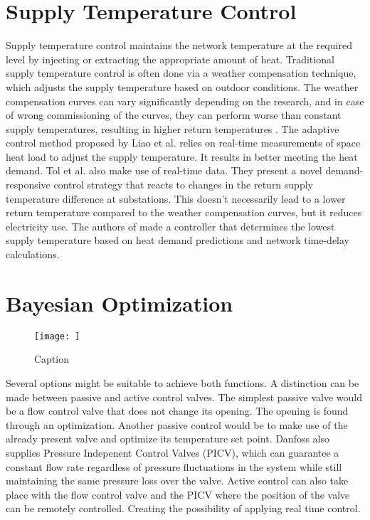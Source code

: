 \section{Supply Temperature Control}
Supply temperature control maintains the network temperature at the required level by injecting or extracting the appropriate amount of heat. Traditional supply temperature control is often done via a weather compensation technique, which adjusts the supply temperature based on outdoor conditions. The weather compensation curves can vary significantly depending on the research, and in case of wrong commissioning of the curves, they can perform worse than constant supply temperatures, resulting in higher return temperatures \cite{app15062982, LIAO200555}. The adaptive control method proposed by Liao et al. \cite{LIAO200555} relies on real-time measurements of space heat load to adjust the supply temperature. It results in better meeting the heat demand. Tol et al. \cite{TOL2021105} also make use of real-time data. They present a novel demand-responsive control strategy that reacts to changes in the return supply temperature difference at substations. This doesn't necessarily lead to a lower return temperature compared to the weather compensation curves, but it reduces electricity use. The authors of \cite{papaKonstantikou} made a controller that determines the lowest supply temperature based on heat demand predictions and network time-delay calculations. 


\section{Bayesian Optimization}

\begin{figure}
    \centering
    \texttt{[image: ]}
    \caption{Caption}
    \label{fig:placeholder}
\end{figure}



Several options might be suitable to achieve both functions. A distinction can be made between passive and active control valves. The simplest passive valve would be a flow control valve that does not change its opening. The opening is found through an optimization. Another passive control would be to make use of the already present valve and optimize its temperature set point. Danfoss also supplies Pressure Indepenent Control Valves (PICV), which can guarantee a constant flow rate regardless of pressure fluctuations in the system while still maintaining the same pressure loss over the valve. Active control can also take place with the flow control valve and the PICV where the position of the valve can be remotely controlled. Creating the possibility of applying real time control.  